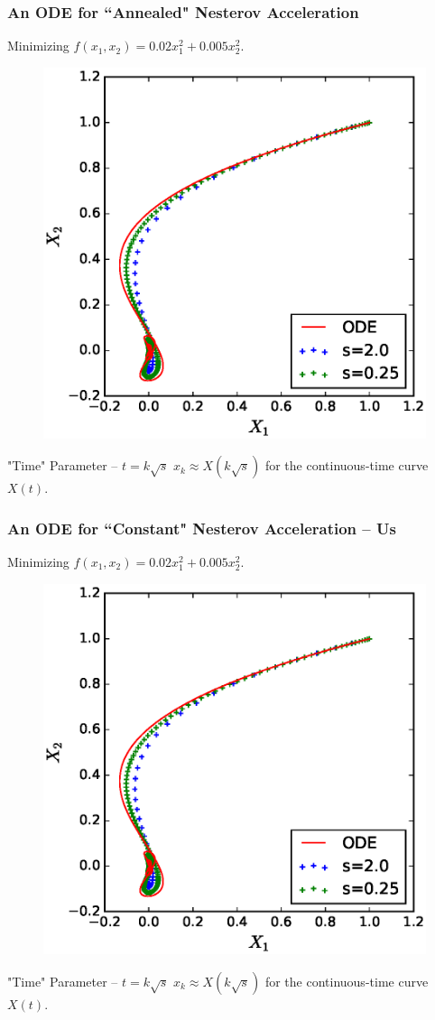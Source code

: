 \documentclass{beamer}
\begin{document}
\begin{frame}
\frametitle{An ODE for ``Annealed" Nesterov Acceleration \citep{su2014differential}}
Minimizing $f(x_1, x_2) = 0.02 x_1^2 + 0.005 x_2^2$.
\begin{figure}
\includegraphics[width=0.6\linewidth]{Experiments/quadratic_traj_compare_annealed.eps}
\caption{}
\end{figure}

\begin{block}{"Time" Parameter -- $t = k \sqrt{s}$}
$x_k \approx X(k \sqrt{s})$
for the continuous-time curve $X(t)$.
\end{block}
\end{frame}


\begin{frame}
\frametitle{An ODE for ``Constant" Nesterov Acceleration -- Us}
Minimizing $f(x_1, x_2) = 0.02 x_1^2 + 0.005 x_2^2$.
\begin{figure}
\includegraphics[width=0.6\linewidth]{Experiments/quadratic_traj_compare_annealed.eps}
\caption{}
\end{figure}

\begin{block}{"Time" Parameter -- $t = k \sqrt{s}$}
$x_k \approx X(k \sqrt{s})$
for the continuous-time curve $X(t)$.
\end{block}
\end{frame}
\end{document}
